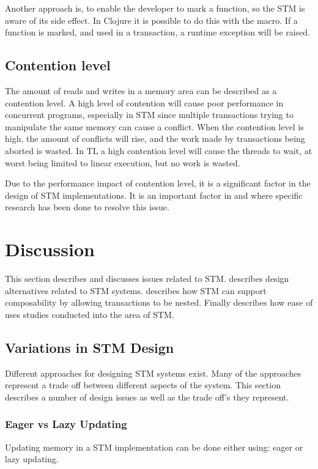 Another approach is, to enable the developer to mark a function, so the \ac{STM} is aware of its side effect. In Clojure it is possible to do this with the  macro. If a function is marked, and used in a transaction, a runtime exception will be raised.

\subsection{Contention level}
The amount of reads and writes in a memory area can be described as a contention level\cite[p. 2084]{herlihy2011tm}. A high level of contention will cause poor performance in concurrent programs, especially in \ac{STM} since multiple transactions trying to manipulate the same memory can cause a conflict. When the contention level is high, the amount of conflicts will rise, and the work made by transactions being aborted is wasted. In \ac{TL} a high contention level will cause the threads to wait, at worst being limited to linear execution, but no work is wasted. 

Due to the performance impact of contention level, it is a significant factor in the design of \ac{STM} implementations. It is an important factor in \cite{harris2003language} and \cite{herlihy2008transactional} where specific research has been done to resolve this issue.

\section{Discussion}
\label{sec:stm_discussion}
This section describes and discusses issues related to \ac{STM}.  describes design alternatives related to \ac{STM} systems.  describes how \ac{STM} can support composability by allowing transactions to be nested. Finally  describes how ease of uses studies conducted into the area of \ac{STM}.

\subsection{Variations in \ac{STM} Design}\label{subsec:stm:variations_in_design}
Different approaches for designing \ac{STM} systems exist. Many of the approaches represent a trade off between different aspects of the system. This section describes a number of design issues as well as the trade off's they represent.

\subsubsection{Eager vs Lazy Updating}
Updating memory in a \ac{STM} implementation can be done either using: eager or lazy updating.

